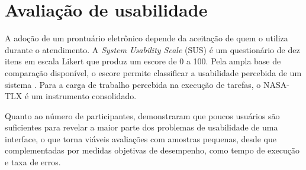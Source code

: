 \section{Avaliação de usabilidade}
\label{sec:usabilidade}

A adoção de um prontuário eletrônico depende da aceitação de quem o utiliza durante o atendimento. A \textit{System Usability Scale} (SUS) \cite{brooke1996} é um questionário de dez itens em escala Likert que produz um escore de 0 a 100. Pela ampla base de comparação disponível, o escore permite classificar a usabilidade percebida de um sistema \cite{bangor2008}. Para a carga de trabalho percebida na execução de tarefas, o NASA-TLX \cite{hart1988} é um instrumento consolidado.

Quanto ao número de participantes,  demonstraram que poucos usuários são suficientes para revelar a maior parte dos problemas de usabilidade de uma interface, o que torna viáveis avaliações com amostras pequenas, desde que complementadas por medidas objetivas de desempenho, como tempo de execução e taxa de erros.
